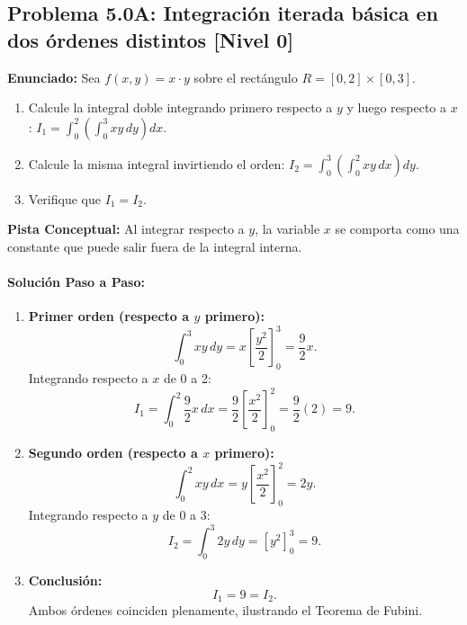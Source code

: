 \documentclass[11pt,a4paper]{article}
\begin{document}
\subsection*{Problema 5.0A: Integración iterada básica en dos órdenes distintos \hfill \color{teal}\small[Nivel 0]}

\begin{tcolorbox}[colback=white,colframe=gray!40,arc=1mm,boxrule=0.5pt,left=3mm,right=3mm,top=2mm,bottom=2mm]
\textbf{Enunciado:} Sea $f(x,y) = x \cdot y$ sobre el rectángulo $R = [0,2] \times [0,3]$.
\begin{enumerate}[label=\textbf{\alph*)}]
\item Calcule la integral doble integrando primero respecto a $y$ y luego respecto a $x$: $I_1 = \int_0^2 \left( \int_0^3 x y \, dy \right) dx$.
\item Calcule la misma integral invirtiendo el orden: $I_2 = \int_0^3 \left( \int_0^2 x y \, dx \right) dy$.
\item Verifique que $I_1 = I_2$.
\end{enumerate}
\end{tcolorbox}

\begin{tcolorbox}[colback=yellow!4,colframe=accentamber!70,arc=1mm,boxrule=0.5pt,left=3mm,right=3mm,top=1.5mm,bottom=1.5mm]
\textbf{Pista Conceptual:} Al integrar respecto a $y$, la variable $x$ se comporta como una constante que puede salir fuera de la integral interna.
\end{tcolorbox}

\paragraph{Solución Paso a Paso:}\par
\begin{enumerate}[label=\textbf{\arabic*.}]
\item \textbf{Primer orden (respecto a $y$ primero):}
\[ \int_0^3 x y \, dy = x \left[ \frac{y^2}{2} \right]_0^3 = \frac{9}{2}x. \]
Integrando respecto a $x$ de 0 a 2:
\[ I_1 = \int_0^2 \frac{9}{2}x \, dx = \frac{9}{2} \left[ \frac{x^2}{2} \right]_0^2 = \frac{9}{2}(2) = 9. \]
\item \textbf{Segundo orden (respecto a $x$ primero):}
\[ \int_0^2 x y \, dx = y \left[ \frac{x^2}{2} \right]_0^2 = 2y. \]
Integrando respecto a $y$ de 0 a 3:
\[ I_2 = \int_0^3 2y \, dy = \left[ y^2 \right]_0^3 = 9. \]
\item \textbf{Conclusión:}
\[ I_1 = 9 = I_2. \]
Ambos órdenes coinciden plenamente, ilustrando el Teorema de Fubini.
\end{enumerate}
\end{document}
